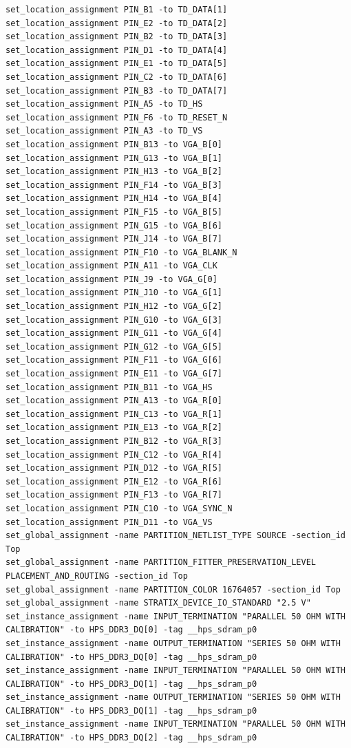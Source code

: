 \documentclass[conference]{IEEEtran}
\begin{document}
\begin{lstlisting}
set_location_assignment PIN_B1 -to TD_DATA[1]
set_location_assignment PIN_E2 -to TD_DATA[2]
set_location_assignment PIN_B2 -to TD_DATA[3]
set_location_assignment PIN_D1 -to TD_DATA[4]
set_location_assignment PIN_E1 -to TD_DATA[5]
set_location_assignment PIN_C2 -to TD_DATA[6]
set_location_assignment PIN_B3 -to TD_DATA[7]
set_location_assignment PIN_A5 -to TD_HS
set_location_assignment PIN_F6 -to TD_RESET_N
set_location_assignment PIN_A3 -to TD_VS
set_location_assignment PIN_B13 -to VGA_B[0]
set_location_assignment PIN_G13 -to VGA_B[1]
set_location_assignment PIN_H13 -to VGA_B[2]
set_location_assignment PIN_F14 -to VGA_B[3]
set_location_assignment PIN_H14 -to VGA_B[4]
set_location_assignment PIN_F15 -to VGA_B[5]
set_location_assignment PIN_G15 -to VGA_B[6]
set_location_assignment PIN_J14 -to VGA_B[7]
set_location_assignment PIN_F10 -to VGA_BLANK_N
set_location_assignment PIN_A11 -to VGA_CLK
set_location_assignment PIN_J9 -to VGA_G[0]
set_location_assignment PIN_J10 -to VGA_G[1]
set_location_assignment PIN_H12 -to VGA_G[2]
set_location_assignment PIN_G10 -to VGA_G[3]
set_location_assignment PIN_G11 -to VGA_G[4]
set_location_assignment PIN_G12 -to VGA_G[5]
set_location_assignment PIN_F11 -to VGA_G[6]
set_location_assignment PIN_E11 -to VGA_G[7]
set_location_assignment PIN_B11 -to VGA_HS
set_location_assignment PIN_A13 -to VGA_R[0]
set_location_assignment PIN_C13 -to VGA_R[1]
set_location_assignment PIN_E13 -to VGA_R[2]
set_location_assignment PIN_B12 -to VGA_R[3]
set_location_assignment PIN_C12 -to VGA_R[4]
set_location_assignment PIN_D12 -to VGA_R[5]
set_location_assignment PIN_E12 -to VGA_R[6]
set_location_assignment PIN_F13 -to VGA_R[7]
set_location_assignment PIN_C10 -to VGA_SYNC_N
set_location_assignment PIN_D11 -to VGA_VS
set_global_assignment -name PARTITION_NETLIST_TYPE SOURCE -section_id Top
set_global_assignment -name PARTITION_FITTER_PRESERVATION_LEVEL PLACEMENT_AND_ROUTING -section_id Top
set_global_assignment -name PARTITION_COLOR 16764057 -section_id Top
set_global_assignment -name STRATIX_DEVICE_IO_STANDARD "2.5 V"
set_instance_assignment -name INPUT_TERMINATION "PARALLEL 50 OHM WITH CALIBRATION" -to HPS_DDR3_DQ[0] -tag __hps_sdram_p0
set_instance_assignment -name OUTPUT_TERMINATION "SERIES 50 OHM WITH CALIBRATION" -to HPS_DDR3_DQ[0] -tag __hps_sdram_p0
set_instance_assignment -name INPUT_TERMINATION "PARALLEL 50 OHM WITH CALIBRATION" -to HPS_DDR3_DQ[1] -tag __hps_sdram_p0
set_instance_assignment -name OUTPUT_TERMINATION "SERIES 50 OHM WITH CALIBRATION" -to HPS_DDR3_DQ[1] -tag __hps_sdram_p0
set_instance_assignment -name INPUT_TERMINATION "PARALLEL 50 OHM WITH CALIBRATION" -to HPS_DDR3_DQ[2] -tag __hps_sdram_p0

\end{lstlisting}
\end{document}
